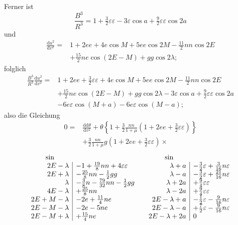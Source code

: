 \noindent Ferner ist
\[
\frac{B^3}{R^3}=1+\tfrac32\varepsilon\varepsilon-3\varepsilon\cos a
+\tfrac92\varepsilon\varepsilon\cos2a
\]
\noindent und
\[
\begin{aligned}
\frac{\mathrm{d}u^2}{\mathrm{d}v^2}={}&1+2ee+4e\cos M+5ee\cos2M
-\tfrac{11}{2}nn\cos2E\\
&+\tfrac{15}{2}ne\cos(2E-M)+gg\cos2\lambda;
\end{aligned}
\]
\noindent folglich
\[
\begin{aligned}
\frac{B^3}{R^3}\frac{\mathrm{d}u^2}{\mathrm{d}v^2}
={}&1+2ee+\tfrac32\varepsilon\varepsilon+4e\cos M+5ee\cos2M
-\tfrac{11}{2}nn\cos2E\\
&+\tfrac{15}{2}ne\cos(2E-M)+gg\cos2\lambda
-3\varepsilon\cos a+\tfrac92\varepsilon\varepsilon\cos2a\\
&-6e\varepsilon\cos(M+a)-6e\varepsilon\cos(M-a);
\end{aligned}
\]
\noindent also die Gleichung
\[
\begin{aligned}
0={}&\frac{\mathrm{dd}\theta}{\mathrm{d}v^2}
+\theta\left\{1+\frac32\frac{nn}{1+\mu}(1+2ee+\tfrac32\varepsilon\varepsilon)\right\}\\
&+\frac32\frac{nn}{1+\mu}g(1+2ee+\tfrac32\varepsilon\varepsilon)\times
\end{aligned}
\]
\begingroup\small
\setlength{\arraycolsep}{3pt}\renewcommand{\arraystretch}{1.5}
\[
\begin{array}{r|l@{\qquad}r|l}
\multicolumn{1}{c}{\sin}& &\multicolumn{1}{c}{\sin}&\\
2E-\lambda&-1+\tfrac{19}{8}nn+4\varepsilon\varepsilon
 &\lambda+a&-\tfrac32\varepsilon+\tfrac{3}{16}n\varepsilon\\
2E+\lambda&-\tfrac{25}{8}nn-\tfrac12gg
 &\lambda-a&-\tfrac32\varepsilon+\tfrac{21}{16}n\varepsilon\\
\lambda&-\tfrac38n-\tfrac{79}{32}nn-\tfrac12gg
 &\lambda+2a&+\tfrac94\varepsilon\varepsilon\\
4E-\lambda&+\tfrac{25}{8}nn
 &\lambda-2a&+\tfrac94\varepsilon\varepsilon\\
2E+M-\lambda&-2e+\tfrac{11}{4}ne
 &2E-\lambda+a&-\tfrac12\varepsilon-\tfrac{9}{16}n\varepsilon\\
2E-M-\lambda&-2e-5ne
 &2E-\lambda-a&+\tfrac72\varepsilon-\tfrac{9}{16}n\varepsilon\\
2E-M+\lambda&+\tfrac{15}{4}ne
 &2E-\lambda+2a&0
\end{array}
\]
\endgroup
{}
\begingroup\small
\setlength{\arraycolsep}{3pt}\renewcommand{\arraystretch}{1.5}
